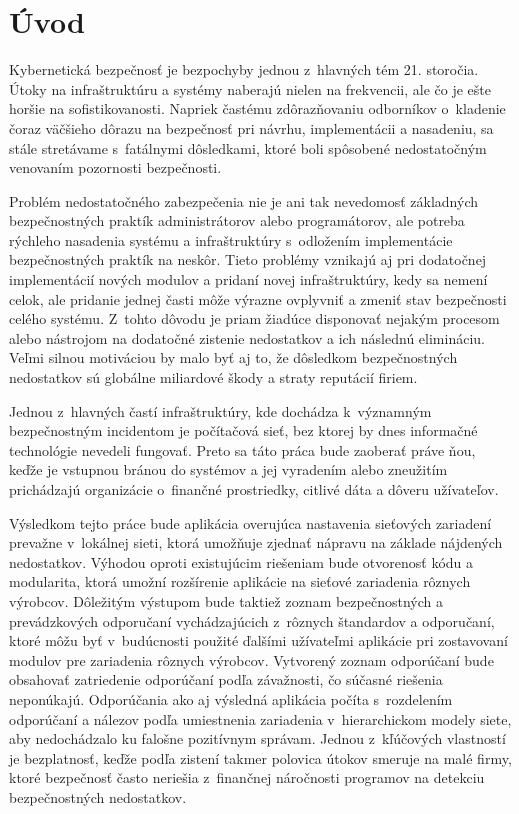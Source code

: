 \chapter*{Úvod}
{}

Kybernetická bezpečnosť je bezpochyby jednou z~hlavných tém 21. storočia. Útoky na infraštruktúru a systémy naberajú nielen na frekvencii, ale čo je ešte horšie na sofistikovanosti. Napriek častému zdôrazňovaniu odborníkov o~kladenie čoraz väčšieho dôrazu na bezpečnosť pri návrhu, implementácii a nasadeniu, sa stále stretávame s~fatálnymi dôsledkami, ktoré boli spôsobené nedostatočným venovaním pozornosti bezpečnosti. 

Problém nedostatočného zabezpečenia nie je ani tak nevedomosť základných bezpečnostných praktík administrátorov alebo programátorov, ale potreba rýchleho nasadenia systému a infraštruktúry s~odložením implementácie bezpečnostných praktík na neskôr. Tieto problémy vznikajú aj pri dodatočnej implementácií nových modulov a pridaní novej infraštruktúry, kedy sa nemení celok, ale pridanie jednej časti môže výrazne ovplyvniť a zmeniť stav bezpečnosti celého systému. Z~tohto dôvodu je priam žiadúce disponovať nejakým procesom alebo nástrojom na dodatočné zistenie nedostatkov a ich následnú elimináciu. Veľmi silnou motiváciou by malo byť aj to, že dôsledkom bezpečnostných nedostatkov sú globálne miliardové škody a straty reputácií firiem. 

Jednou z~hlavných častí infraštruktúry, kde dochádza k~významným bezpečnostným incidentom je počítačová sieť, bez ktorej by dnes informačné technológie nevedeli fungovať. Preto sa táto práca bude zaoberať práve ňou, keďže je vstupnou bránou do systémov a jej vyradením alebo zneužitím prichádzajú organizácie o~finančné prostriedky, citlivé dáta a dôveru užívateľov.

Výsledkom tejto práce bude aplikácia overujúca nastavenia sieťových zariadení prevažne v~lokálnej sieti, ktorá umožňuje zjednať nápravu na základe nájdených nedostatkov. Výhodou oproti existujúcim riešeniam bude otvorenosť kódu a modularita, ktorá umožní rozšírenie aplikácie na sieťové zariadenia rôznych výrobcov. Dôležitým výstupom bude taktiež zoznam bezpečnostných a prevádzkových odporučaní vychádzajúcich z~rôznych štandardov a odporučaní, ktoré môžu byť v~budúcnosti použité ďalšími užívateľmi aplikácie pri zostavovaní modulov pre zariadenia rôznych výrobcov. Vytvorený zoznam odporúčaní bude obsahovať zatriedenie odporúčaní podľa závažnosti, čo súčasné riešenia neponúkajú. Odporúčania ako aj výsledná aplikácia počíta s~rozdelením odporúčaní a nálezov podľa umiestnenia zariadenia v~hierarchickom modely siete, aby nedochádzalo ku falošne pozitívnym správam. Jednou z~kľúčových vlastností je bezplatnosť, keďže podľa zistení takmer polovica útokov smeruje na malé firmy, ktoré bezpečnosť často neriešia z~finančnej náročnosti programov na detekciu bezpečnostných nedostatkov.    
